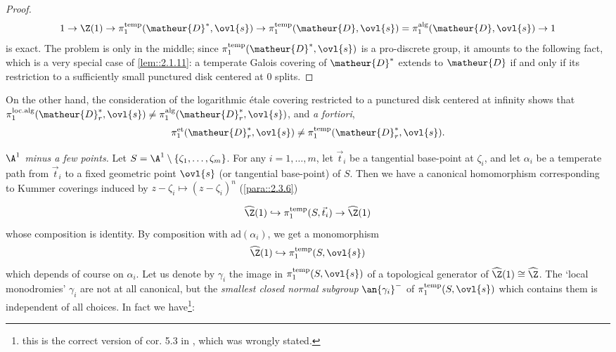 \begin{proof}
 \begin{equation*}
 1\to \Z(1)\to \pi_1^{\mathrm{temp}}(\matheur{D}^\ast,\ovl{s}) \to
 \pi_1^{\mathrm{temp}}(\matheur{D} ,\ovl{s})=
 \pi_1^{\mathrm{alg}}(\matheur{D} ,\ovl{s})\to 1 
 \end{equation*}
 is exact. The problem is only in the middle; since
 $\pi_1^{\mathrm{temp}}(\matheur{D}^\ast,\ovl{s})$ is a pro-discrete group, it
 amounts to the following fact, which is a very special case of
 \ref{lem::2.1.11}: a 
 temperate Galois covering of $\matheur{D}^\ast$ extends to
 $\matheur{D}$ if and only if its 
 restriction to a sufficiently small punctured disk centered at $0$ splits.
\end{proof}

\medskip
On the other hand, the consideration of the logarithmic \'etale covering
restricted to a punctured disk centered at infinity shows that
$\pi_1^{\mathrm{loc.alg}}(\matheur{D}_r^\ast,\ovl{s})\neq
\pi_1^{\mathrm{alg}}(\matheur{D}_r^\ast,\ovl{s})$, and {\it a fortiori},
\begin{equation*}
 \pi_1^{\mathrm{et}}(\matheur{D}_r^\ast,\ovl{s})\neq
 \pi_1^{\mathrm{temp}}(\matheur{D}_r^\ast,\ovl{s}).
\end{equation*}
  
\begin{para}\label{para::2.3.8} {\it $\A^1$ minus a few points.}
 Let $S=\A^1\setminus\{\zeta_1,\ldots,\zeta_m\}$. For any $i=1,\ldots,
 m$, let $\vec t_i$ be a tangential base-point at $\zeta_i$, and let
 $\alpha_i$ be a temperate path from $\vec t_i$ to a fixed geometric
 point $\ovl{s} $ (or tangential base-point) of $ S$. Then we have a
 canonical homomorphism corresponding to Kummer coverings induced by
 $z-\zeta_i\mapsto (z-\zeta_i)^n$ (\cf \ref{para::2.3.6})

 \begin{equation*}
  \widehat{\Z}(1)\hookrightarrow \pi_1^{\mathrm{temp}}(S,\vec
  t_i)\to\widehat{\Z}(1)
 \end{equation*}
 whose composition is identity. 
 By composition with $\mathrm{ad}(\alpha_i)$, we get a monomorphism 
 \begin{equation*}
  \widehat{\Z}(1)\hookrightarrow \pi_1^{\mathrm{temp}}(S,\ovl{s}) 
 \end{equation*}
 which depends of course on $\alpha_i$.  Let us denote by $\gamma_i$ the
 image in $\pi_1^{\mathrm{temp}}(S,\ovl{s})$ of a topological generator
 of $\widehat{\Z}(1)\cong \widehat{\Z}$. The `local monodromies' $\gamma_i$ are
 not at all canonical, but the {\it smallest closed normal subgroup}
 $\an{\gamma_i}^-$ of $\pi_1^{\mathrm{temp}}(S,\ovl{s}) $ which contains
 them is independent of all choices. In fact we have\footnote{this is
 the correct version of cor. 5.3 in \cite{poaptg}, which was wrongly
 stated.}: 
\end{para}

